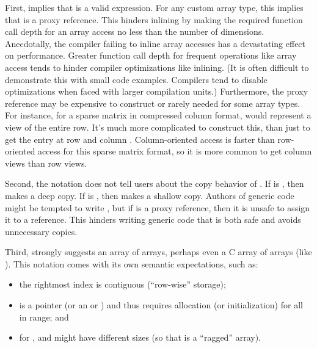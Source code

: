 \documentclass{wg21}
\begin{document}
First,  implies that  is a valid expression.  For any custom array type, this implies that  is a proxy reference.  This hinders inlining by making the required function call depth for an array access no less than the number of dimensions.  Anecdotally, the compiler failing to inline array accesses has a devastating effect on performance.  Greater function call depth for frequent operations like array access tends to hinder compiler optimizations like inlining.  (It is often difficult to demonstrate this with small code examples.  Compilers tend to disable optimizations when faced with larger compilation units.)  Furthermore, the proxy reference  may be expensive to construct or rarely needed for some array types.  For instance, for a sparse matrix in compressed column format,  would represent a view of the entire row.  It's much more complicated to construct this, than just to get the entry at row  and column .  Column-oriented access is faster than row-oriented access for this sparse matrix format, so it is more common to get column views than row views.

Second, the notation  does not tell users about the copy behavior of .  If  is , then  makes a deep copy.  If  is , then  makes a shallow copy.  Authors of generic code might be tempted to write , but if  is a proxy reference, then it is unsafe to assign it to a reference.  This hinders writing generic code that is both safe and avoids unnecessary copies.

Third,  strongly suggests an array of arrays, perhaps even a C array of arrays (like ).  This notation comes with its own semantic expectations, such as:

\begin{itemize}
\item the rightmost index is contiguous (``row-wise'' storage);
\item {} is a pointer (or an  or )
  and thus requires allocation (or initialization) for all  in range; and
\item for ,  and  might have different sizes
  (so that  is a ``ragged'' array).
\end{itemize}
\end{document}
